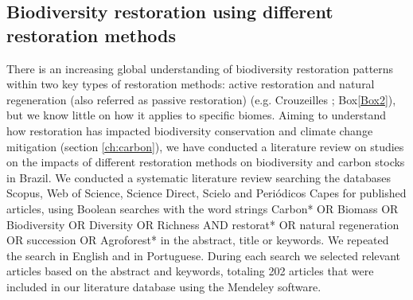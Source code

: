 \subsection{\large Biodiversity restoration using different restoration methods} \label{subsec:bio-revisão}
%
There is an increasing global understanding of biodiversity restoration patterns within two key types of restoration methods: active restoration and natural regeneration (also referred as passive restoration) (e.g. Crouzeilles \cite{Crouzeilles2017a}; Box\ref{Box2}), but we know little on how it applies to specific biomes. Aiming to understand how restoration has impacted biodiversity conservation and climate change mitigation (section \ref{ch:carbon}), we have conducted a literature review on studies on the impacts of different restoration methods on biodiversity and carbon stocks in Brazil. We conducted a systematic literature review searching the databases Scopus, Web of Science, Science Direct, Scielo and Periódicos Capes for published articles, using Boolean searches with the word strings Carbon* OR Biomass OR Biodiversity OR Diversity OR Richness AND restorat* OR natural regeneration OR succession OR Agroforest* in the abstract, title or keywords. We repeated the search in English and in Portuguese. During each search we selected relevant articles based on the abstract and keywords, totaling 202 articles that were included in our literature database using the Mendeley software. \\
